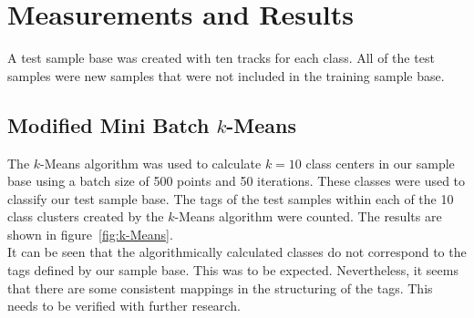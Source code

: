 \section{Measurements and Results}
\label{sec:Measurements}
A test sample base was created with ten tracks for each class. All of the test samples were new samples that were not included in the training sample base.

\subsection{Modified Mini Batch $k$-Means}
The $k$-Means algorithm was used to calculate $k=10$ class centers in our sample base using a batch size of 500 points and 50 iterations. These classes were used to classify our test sample base. The tags of the test samples within each of the 10 class clusters created by the $k$-Means algorithm were counted. The results are shown in figure~\ref{fig:k-Means}.\\
It can be seen that the algorithmically calculated classes do not correspond to the tags defined by our sample base. This was to be expected. Nevertheless, it seems that there are some consistent mappings in the structuring of the tags. This needs to be verified with further research.

